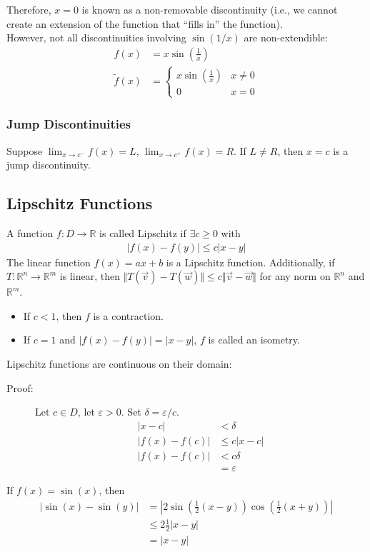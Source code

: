 \documentclass[10pt]{extarticle}
\newcommand{\R}{\mathbb{R}}
\begin{document}
    Therefore, $x = 0$ is known as a non-removable discontinuity (i.e., we cannot create an extension of the function that ``fills in'' the function).\\

    However, not all discontinuities involving $\sin(1/x)$ are non-extendible:
    \begin{align*}
      f(x) &= x\sin\left(\frac{1}{x}\right)\\
      \tilde{f}(x) &= \begin{cases}
        x\sin\left(\frac{1}{x}\right) & x\neq 0\\
        0 & x = 0
      \end{cases}
    \end{align*}
    \subsubsection{Jump Discontinuities}%
    Suppose $\lim_{x\rightarrow c^-}f(x) = L$, $\lim_{x\rightarrow c^+} f(x) = R$. If $L \neq R$, then $x = c$ is a jump discontinuity.
  \subsection{Lipschitz Functions}%
    A function $f: D\rightarrow \R$ is called Lipschitz if $\exists c \geq 0$ with 
    \begin{align*}
      |f(x) - f(y)| \leq c|x-y| \tag*{$\forall x,y\in D$}
    \end{align*}
    The linear function $f(x) = ax + b$ is a Lipschitz function. Additionally, if $T: \R^n \rightarrow \R^m$ is linear, then $\Vert T(\vec{v}) - T(\vec{w})\Vert \leq c\Vert \vec{v}-\vec{w}\Vert$ for any norm on $\R^n$ and $\R^m$.
    \begin{itemize}
      \item If $c < 1$, then $f$ is a contraction.
      \item If $c = 1$ and $|f(x) - f(y)| = |x-y|$, $f$ is called an isometry.
    \end{itemize}
    Lipschitz functions are continuous on their domain:
    \begin{description}
      \item[Proof:] Let $c\in D$, let $\varepsilon > 0$. Set $\delta = \varepsilon/c$.
        \begin{align*}
          |x-c| &< \delta\\
          |f(x) - f(c)| &\leq c|x-c|\\
          |f(x) - f(c)| &< c\delta\\
                        &= \varepsilon
        \end{align*}
    \end{description}
    If $f(x) = \sin(x)$, then
    \begin{align*}
      |\sin(x) - \sin(y)| &= \left|2\sin\left(\frac{1}{2}(x-y)\right)\cos\left(\frac{1}{2}(x+y)\right)\right|\\
                          &\leq 2\frac{1}{2}|x-y|\\
                          &= |x-y|
    \end{align*}
\end{document}
